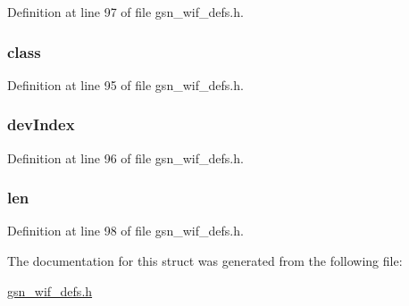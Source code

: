 Definition at line 97 of file gsn\_\-wif\_\-defs.h.

\hypertarget{a00337_ab2aaa57d5f0775790d105e3fc94ec8a1}{
\subsubsection[{class}]{ {\bf class}}}
\label{a00337_ab2aaa57d5f0775790d105e3fc94ec8a1}


Definition at line 95 of file gsn\_\-wif\_\-defs.h.

\hypertarget{a00337_ae6b8b33d80e4df49b18e199b0046750c}{
\subsubsection[{devIndex}]{ {\bf devIndex}}}
\label{a00337_ae6b8b33d80e4df49b18e199b0046750c}


Definition at line 96 of file gsn\_\-wif\_\-defs.h.

\hypertarget{a00337_ab3bcead9c261261394a5d9b3bf8f95cb}{
\subsubsection[{len}]{ {\bf len}}}
\label{a00337_ab3bcead9c261261394a5d9b3bf8f95cb}


Definition at line 98 of file gsn\_\-wif\_\-defs.h.



The documentation for this struct was generated from the following file:\begin{DoxyCompactItemize}
\item 
\hyperlink{a00610}{gsn\_\-wif\_\-defs.h}\end{DoxyCompactItemize}
